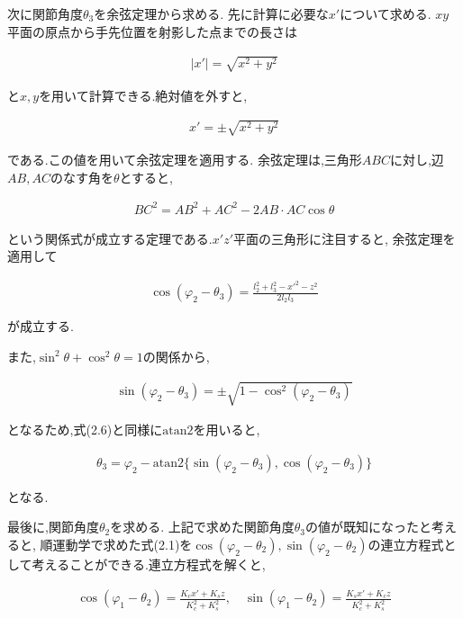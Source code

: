 次に関節角度$\theta_3$を余弦定理から求める.
先に計算に必要な$x'$について求める.
$xy$平面の原点から手先位置を射影した点までの長さは

\begin{align}
  |x'| = \sqrt{x^2 + y^2} \tag{2.7}
\end{align}

と$x, y$を用いて計算できる.絶対値を外すと,

\begin{align}
  x' = \pm \sqrt{x^2 + y^2} \tag{2.8}
\end{align}

である.この値を用いて余弦定理を適用する.
余弦定理は,三角形$ABC$に対し,辺$AB, AC$のなす角を$\theta$とすると,

\begin{align}
  BC^2 = AB^2 + AC^2 - 2 AB \cdot AC \cos \theta \tag{2.9}
\end{align}

という関係式が成立する定理である.$x'z'$平面の三角形に注目すると,
余弦定理を適用して

\begin{align}
  \cos(\varphi_2 - \theta_3) = \frac{l_2^2 + l_3^2 - x'^2 - z^2}{2 l_2 l_3} \tag{2.10}
\end{align}

が成立する.

また,$\sin^2 \theta + \cos^2 \theta = 1$の関係から,

\begin{align}
  \sin(\varphi_2 - \theta_3) = \pm \sqrt{1 - \cos^2 (\varphi_2 - \theta_3)} \tag{2.11}
\end{align}

となるため,式(2.6)と同様に$\text{atan2}$を用いると,

\begin{align}
  \theta_3 = \varphi_2 - \text{atan2} \{ \sin(\varphi_2 - \theta_3), \cos(\varphi_2 - \theta_3) \} \tag{2.12}
\end{align}

となる.

最後に,関節角度$\theta_2$を求める.
上記で求めた関節角度$\theta_3$の値が既知になったと考えると,
順運動学で求めた式(2.1)を$\cos(\varphi_2 - \theta_2), \sin(\varphi_2 - \theta_2)$の連立方程式として考えることができる.連立方程式を解くと,

\begin{align}
  \cos(\varphi_1 - \theta_2) = \frac{K_c x' + K_s z}{K_c^2 + K_s^2}, \quad \sin(\varphi_1 - \theta_2) = \frac{K_s x' + K_c z}{K_c^2 + K_s^2} \tag{2.13}
\end{align}

